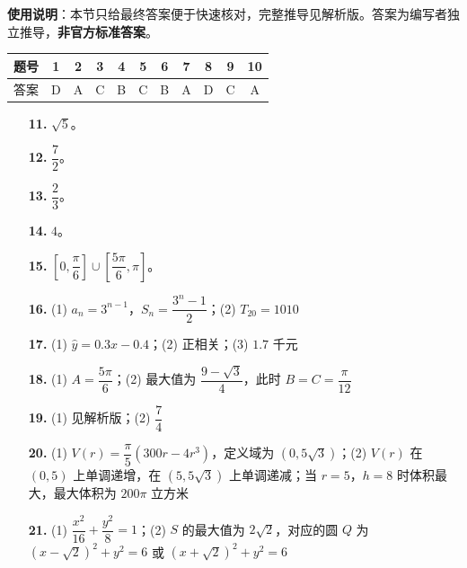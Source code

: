 
\begin{gknotice}
\textbf{使用说明}：本节只给最终答案便于快速核对，完整推导见解析版。答案为编写者独立推导，\textbf{非官方标准答案}。
\end{gknotice}

\begin{center}\begin{tabular}{ccccccccccc}
\toprule
题号 & 1 & 2 & 3 & 4 & 5 & 6 & 7 & 8 & 9 & 10 \\
\midrule
答案 & D & A & C & B & C & B & A & D & C & A \\
\bottomrule
\end{tabular}\end{center}

\begin{itemize}[leftmargin=2.6em]
  \item[\textbf{11.}] $\sqrt5$。
  \item[\textbf{12.}] $\dfrac72$。
  \item[\textbf{13.}] $\dfrac23$。
  \item[\textbf{14.}] $4$。
  \item[\textbf{15.}] $\left[0,\dfrac\pi6\right]\cup\left[\dfrac{5\pi}6,\pi\right]$。
\end{itemize}

\begin{itemize}[leftmargin=2.6em]
  \item[\textbf{16.}] (1) $a_n=3^{n-1}$，$S_n=\dfrac{3^n-1}2$；(2) $T_{20}=1010$
  \item[\textbf{17.}] (1) $\hat y=0.3x-0.4$；(2) 正相关；(3) $1.7$ 千元
  \item[\textbf{18.}] (1) $A=\dfrac{5\pi}6$；(2) 最大值为 $\dfrac{9-\sqrt3}4$，此时 $B=C=\dfrac\pi{12}$
  \item[\textbf{19.}] (1) 见解析版；(2) $\dfrac74$
  \item[\textbf{20.}] (1) $V(r)=\dfrac\pi5(300r-4r^3)$，定义域为 $(0,5\sqrt3)$；(2) $V(r)$ 在 $(0,5)$ 上单调递增，在 $(5,5\sqrt3)$ 上单调递减；当 $r=5$，$h=8$ 时体积最大，最大体积为 $200\pi$ 立方米
  \item[\textbf{21.}] (1) $\dfrac{x^2}{16}+\dfrac{y^2}8=1$；(2) $S$ 的最大值为 $2\sqrt2$，对应的圆 $Q$ 为 $(x-\sqrt2)^2+y^2=6$ 或 $(x+\sqrt2)^2+y^2=6$
\end{itemize}

